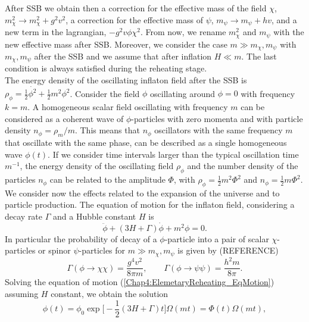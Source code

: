\documentclass[11pt,a4paper,twoside]{book}
\begin{document}
After SSB we obtain then a correction for the effective mass of the field $\chi$, $ m^{2}_{\chi} \rightarrow m^{2}_{\chi}+g^{2}v^{2} $, a correction for the effective mass of $\psi$, $ m_{\psi} \rightarrow m_{\psi} + hv $, and a new term in the lagrangian, $ -g^{2}v\phi \chi^{2} $. From now, we rename $ m^{2}_{\chi} $ and $ m_{\psi} $ with the new effective mass after SSB. Moreover, we consider the case $ m \gg m_{\chi}, m_{\psi} $ with $ m_{\chi},m_{\psi} $ after the SSB and we assume that after inflation $ H \ll m $. The last condition is always satisfied during the reheating stage.\\
The energy density of the oscillating inflaton field after the SSB is $ \rho_{\phi} = \frac{1}{2}\dot{\phi^{2}} + \frac{1}{2}m^{2}\phi^{2}$. Consider the field $\phi$ oscillating around $\phi=0$ with frequency $ k=m $. A homogeneous scalar field oscillating with frequency $ m $ can be considered as a coherent wave of $ \phi $-particles with zero momenta and with particle density $ n_{\phi}=\rho_{m}/m $. This means that $ n_{\phi} $ oscillators with the same frequency $ m $ that oscillate with the same phase, can be described as a single homogeneous wave $\phi(t)$. If we consider time intervals larger than the typical oscillation time $ m^{-1} $, the energy density of the oscillating field $\rho_{\phi}$ and the number density of the particles $ n_{\phi} $ can be related to the amplitude $\Phi$, with $\rho_{\phi}=\frac{1}{2}m^{2}\Phi^{2}$ and $ n_{\phi}=\frac{1}{2}m\Phi^{2} $.\\
We consider now the effects related to the expansion of the universe and to particle production. The equation of motion for the inflaton field, considering a decay rate $ \Gamma $ and a Hubble constant $ H $ is
\begin{equation}
	\label{Chap4:ElemetaryReheating_EqMotion}
	\ddot{\phi} + (3H + \Gamma)\dot{\phi} + m^{2}\phi = 0.
\end{equation}
In particular the probability of decay of a $ \phi $-particle into a pair of scalar $ \chi $-particles or spinor $ \psi $-particles for $ m \gg m_{\chi},m_{\psi} $ is given by (REFERENCE)
\begin{equation}
	\label{Chap4:ElemReheating_DecayRate}
	\Gamma(\phi \rightarrow \chi \chi) = \frac{g^{4}v^{2}}{8\pi m},
	\qquad
	\Gamma(\phi \rightarrow \psi \psi) = \frac{h^{2}m}{8\pi}.
\end{equation}
Solving the equation of motion (\ref{Chap4:ElemetaryReheating_EqMotion}) assuming $ H $ constant, we obtain the solution
\begin{equation}
	\label{Chap4:ElemReheating_solution}
	\phi(t)=\phi_{0}\exp\Big[-\frac{1}{2}(3H+\Gamma)t\Big]\Omega(mt)=\Phi(t)\Omega(mt),
\end{equation}
\end{document}
